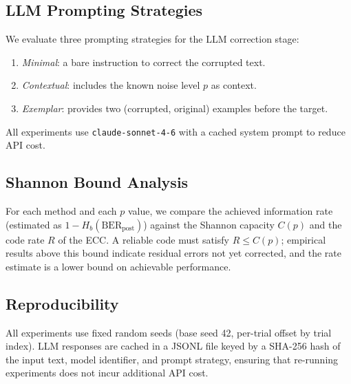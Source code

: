 \subsection{LLM Prompting Strategies}

We evaluate three prompting strategies for the LLM correction stage:
\begin{enumerate}
  \item \emph{Minimal}: a bare instruction to correct the corrupted text.
  \item \emph{Contextual}: includes the known noise level $p$ as context.
  \item \emph{Exemplar}: provides two (corrupted, original) examples before the target.
\end{enumerate}
All experiments use \texttt{claude-sonnet-4-6} with a cached system prompt to
reduce API cost.

\subsection{Shannon Bound Analysis}

For each method and each $p$ value, we compare the achieved information rate
(estimated as $1 - H_b(\text{BER}_\text{post})$) against the Shannon capacity
$C(p)$ and the code rate $R$ of the ECC.  A reliable code must satisfy
$R \leq C(p)$; empirical results above this bound indicate residual errors not
yet corrected, and the rate estimate is a lower bound on achievable performance.

\subsection{Reproducibility}

All experiments use fixed random seeds (base seed 42, per-trial offset by trial
index).  LLM responses are cached in a JSONL file keyed by a SHA-256 hash of
the input text, model identifier, and prompt strategy, ensuring that re-running
experiments does not incur additional API cost.
